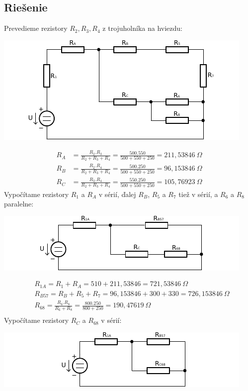 \subsection{Riešenie}
Prevedieme rezistory $R_{2}, R_{3}, R_{4}$ z trojuholníka na hviezdu:
\begin{center}
  \includegraphics[width=0.8\columnwidth,keepaspectratio]{res/u1o2}
\end{center}
\begin{align*}
    R_{A} &= \frac{R_{2}.R_{3}}{R_{2} + R_{3} + R_{4}} = \frac{500.550}{500 +
550 + 250} = 211,53846~\Omega \\
R_{B} &= \frac{R_{2}.R_{4}}{R_{2} + R_{3} + R_{4}} = \frac{500.250}{500 +
550 + 250} = 96,153846~\Omega \\
R_{C} &= \frac{R_{3}.R_{4}}{R_{2} + R_{3} + R_{4}} = \frac{550.250}{500 +
550 + 250} = 105,76923~\Omega 
\end{align*}
Vypočítame rezistory $R_{1}$ a $R_{A}$ v sérií, ďalej $R_{B}$, $R_{5}$ a $R_{7}$ tiež v sérií, a $R_{6}$ a $R_{8}$ paralelne:
\begin{center}
  \includegraphics[width=0.8\columnwidth,keepaspectratio]{res/u1o3}
\end{center}
\begin{align*}
    &R_{1A} = R_{1} + R_{A} = 510 + 211,53846 = 721,53846~\Omega \\
    &R_{B57} = R_{B} + R_{5} + R_{7} = 96,153846 + 300 + 330 =
726,153846~\Omega \\
&R_{68} = \frac{R_{6}.R_{8}}{R_{6} + R_{8}} = \frac{800.250}{800 + 250} =
190,47619~\Omega \\
\end{align*}
Vypočítame rezistory $R_{C}$ a $R_{68}$ v sérií:
\begin{center}
  \includegraphics[width=0.8\columnwidth,keepaspectratio]{res/u1o4}
\end{center}

